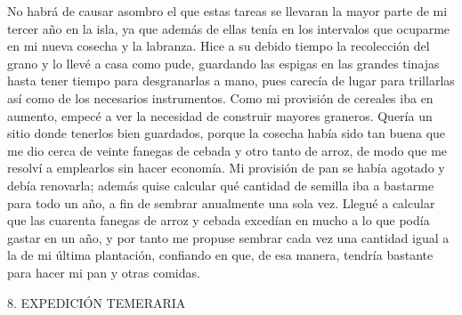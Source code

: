 \documentclass{novela}
\begin{document}
    No habrá de causar asombro el que estas tareas se llevaran la mayor parte de mi tercer año en la isla, ya que además de ellas tenía en los intervalos que ocuparme en mi nueva cosecha y la labranza. Hice a su debido tiempo la recolección del grano y lo llevé a casa como pude, guardando las espigas en las grandes tinajas hasta tener tiempo para desgranarlas a mano, pues carecía de lugar para trillarlas así como de los necesarios instrumentos.
    Como mi provisión de cereales iba en aumento, empecé a ver la necesidad de construir mayores graneros. Quería un sitio donde tenerlos bien guardados, porque la cosecha había sido tan buena que me dio cerca de veinte fanegas de cebada y otro tanto de arroz, de modo que me resolví a emplearlos sin hacer economía. Mi provisión de pan se había agotado y debía renovarla; además quise calcular qué cantidad de semilla iba a bastarme para todo un año, a fin de sembrar anualmente una sola vez.
    Llegué a calcular que las cuarenta fanegas de arroz y cebada excedían en mucho a lo que podía gastar en un año, y por tanto me propuse sembrar cada vez una cantidad igual a la de mi última plantación, confiando en que, de esa manera, tendría bastante para hacer mi pan y otras comidas.





    8. EXPEDICIÓN TEMERARIA
\end{document}
